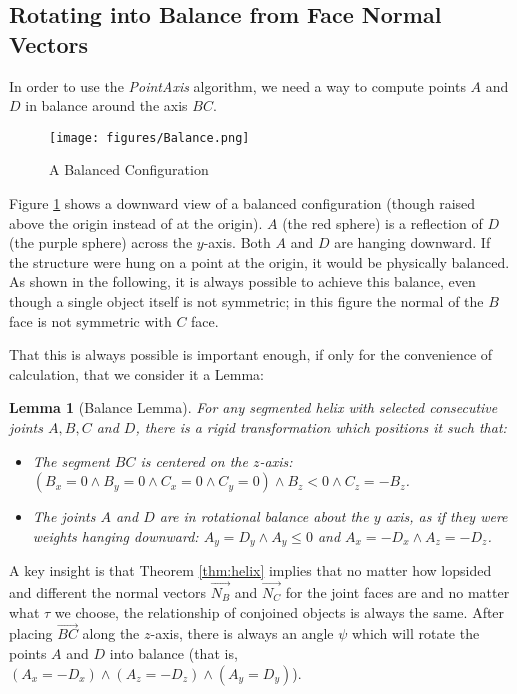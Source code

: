 \documentclass[11pt]{article}
\newtheorem{lemma}{Lemma}
\newenvironment{sketch}{%
  \renewcommand{\proofname}{Proof Sketch}\proof}{\endproof}
\begin{document}
{\subsection{Rotating into Balance from Face Normal Vectors}

\label{sec:balance}



In order to use the {\em PointAxis} algorithm, we need a way
to compute points $A$ and $D$ in balance around the axis $BC$.

\begin{figure}
     \centering
     \texttt{[image: figures/Balance.png]}
     \caption{A Balanced Configuration}
  \label{fig:balancediagram}
\end{figure}


Figure \ref{fig:balancediagram} shows a downward view of a
balanced configuration (though raised above the origin
instead of at the origin).
$A$ (the red sphere) is a reflection of $D$ (the purple sphere) across
the $y$-axis.
Both $A$ and $D$ are hanging downward.
If the structure were hung on a point at the origin, it would
be physically balanced.
As shown in the following, it is always possible to achieve this balance,
even though a single object
itself is not symmetric; in this figure the normal of the $B$ face is not symmetric with $C$ face.

That this is always possible is important enough, if only for
the convenience of calculation, that we consider it a Lemma:
\begin{lemma}[Balance Lemma]
  For any segmented helix with selected consecutive joints $A,B,C$ and $D$,
  there is a rigid transformation which positions it such that:
  \begin{itemize}
  \item The segment $BC$ is centered on the $z$-axis:
    $(B_x = 0 \wedge B_y = 0 \wedge C_x = 0 \wedge C_y = 0)
    \wedge B_z < 0 \wedge C_z = -B_z$.
  \item The joints $A$ and $D$ are in rotational balance about
    the $y$ axis, as if they were weights hanging downward:
    $A_y = D_y \wedge A_y \leq 0 $ and
    $A_x = -D_x \wedge A_z = -D_z$.
  \end{itemize}
  \label{lem:balance}
\end{lemma}


\begin{sketch}

A key insight is that Theorem \ref{thm:helix} implies that no matter
how lopsided and different
the normal vectors  $\overrightarrow{N_B}$ and $\overrightarrow{N_C}$
for the joint faces are and no matter what $\tau$ we choose,
the relationship of conjoined objects
is always the same.
After placing $\overrightarrow{BC}$ along
the $z$-axis, there is always an angle $\psi$ which will
rotate the points $A$ and $D$ into balance (that is, $(A_x = -D_x) \wedge (A_z = -D_z) \wedge (A_y = D_y)$).


\end{sketch}}
\end{document}
